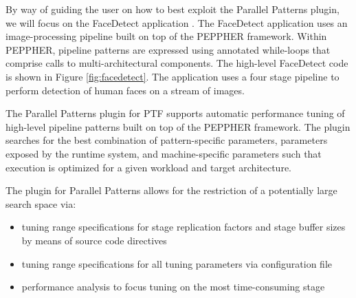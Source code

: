 
By way of guiding the user on how to best exploit the Parallel Patterns plugin, we will focus on the FaceDetect application \cite{FaceDetect}. The FaceDetect application uses an image-processing pipeline built on top of the PEPPHER framework. Within PEPPHER, pipeline patterns are expressed using annotated while-loops that comprise calls to multi-architectural components. The high-level FaceDetect code is shown in Figure \ref{fig:facedetect}. The application uses a four stage pipeline to perform detection of human faces on a stream of images. 

    
The Parallel Patterns plugin for PTF supports automatic performance tuning of  high-level pipeline patterns built on top of the PEPPHER framework. The plugin searches for the best combination of pattern-specific parameters, parameters exposed by the runtime system, and machine-specific parameters such that execution is optimized for a given workload and target architecture.

The plugin for Parallel Patterns allows for the restriction of a potentially large search space via: 

  \begin{itemize}
    \item tuning range specifications for stage replication factors and stage buffer sizes by means of source code directives
    \item tuning range specifications for all tuning parameters via configuration file 
    \item performance analysis to focus tuning on the most time-consuming stage
  \end{itemize}

